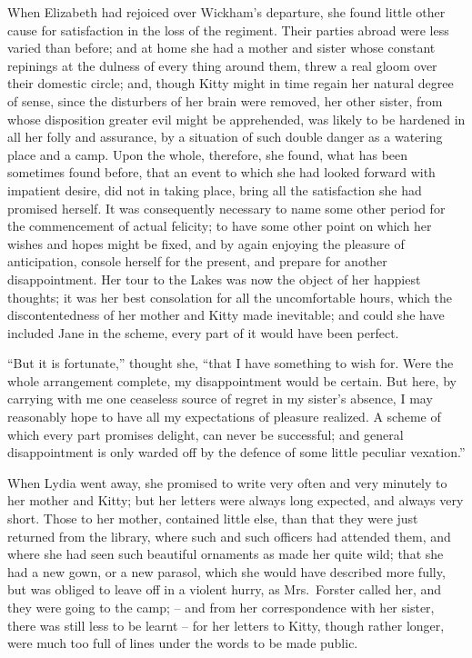 When Elizabeth had rejoiced over Wickham’s departure,
she found little other cause for satisfaction in the loss of
the regiment. Their parties abroad were less varied than
before; and at home she had a mother and sister whose
constant repinings at the dulness of every thing around
them, threw a real gloom over their domestic circle;
and, though Kitty might in time regain her natural degree
of sense, since the disturbers of her brain were removed,
her other sister, from whose disposition greater evil might
be apprehended, was likely to be hardened in all her folly
and assurance, by a situation of such double danger as
a watering place and a camp. Upon the whole, therefore,
she found, what has been sometimes found before, that
an event to which she had looked forward with impatient
desire, did not in taking place, bring all the satisfaction
she had promised herself. It was consequently necessary
to name some other period for the commencement of
actual felicity; to have some other point on which her
wishes and hopes might be fixed, and by again enjoying
the pleasure of anticipation, console herself for the present,
and prepare for another disappointment. Her tour to
the Lakes was now the object of her happiest thoughts;
it was her best consolation for all the uncomfortable
hours, which the discontentedness of her mother and
Kitty made inevitable; and could she have included
Jane in the scheme, every part of it would have been
perfect.

“But it is fortunate,” thought she, “that I have something
to wish for. Were the whole arrangement complete,
my disappointment would be certain. But here, by
carrying with me one ceaseless source of regret in my
sister’s absence, I may reasonably hope to have all my
expectations of pleasure realized. A scheme of which
every part promises delight, can never be successful; and
general disappointment is only warded off by the defence
of some little peculiar vexation.”

When Lydia went away, she promised to write very
often and very minutely to her mother and Kitty; but
her letters were always long expected, and always very
short. Those to her mother, contained little else, than
that they were just returned from the library, where
such and such officers had attended them, and where she
had seen such beautiful ornaments as made her quite
wild; that she had a new gown, or a new parasol, which
she would have described more fully, but was obliged
to leave off in a violent hurry, as Mrs.\ Forster called her,
and they were going to the camp; -- and from her correspondence
with her sister, there was still less to be learnt -- for
her letters to Kitty, though rather longer, were much
too full of lines under the words to be made public.

